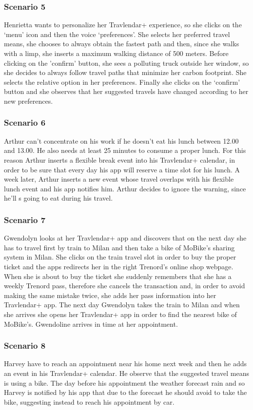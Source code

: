 	\subsubsection{Scenario 5}
		Henrietta wants to personalize her Travlendar+ experience, so she clicks on the ‘menu’ icon and then the voice ‘preferences’. She selects her preferred travel means, she chooses to always obtain the fastest path and then, since she walks with a limp, she inserts a maximum walking distance of 500 meters. Before clicking on the 'confirm' button, she sees a polluting truck outside her window, so she decides to always follow travel paths that minimize her carbon footprint. She selects the relative option in her preferences. Finally she clicks on the ‘confirm’ button and she observes that her suggested travels have changed according to her new preferences.
	\subsubsection{Scenario 6}
		Arthur can’t concentrate on his work if he doesn't eat his lunch between 12.00 and 13.00. He also needs at least 25 minutes to consume a proper lunch.
For this reason Arthur inserts a flexible break event into his Travlendar+ calendar, in order to be sure that every day his app will reserve a time slot for his lunch.
A week later, Arthur inserts a new event whose travel overlaps with his flexible lunch event and his app notifies him. Arthur decides to ignore the warning, since he'll s going to eat during his travel.
	\subsubsection{Scenario 7}
		Gwendolyn looks at her Travlendar+ app and discovers that on the next day she has to travel first by train to Milan and then take a bike of MoBike’s sharing system in Milan. She clicks on the train travel slot in order to buy the proper ticket and the apps redirects her in the right Trenord’s online shop webpage. When she is about to buy the ticket she suddenly remembers that she has a weekly Trenord pass, therefore she cancels the transaction and, in order to avoid making the same mistake twice, she adds her pass information into her Travlendar+ app. The next day Gwendolyn takes the train to Milan and when she arrives she opens her Travlendar+ app in order to find the nearest bike of MoBike’s. Gwendoline arrives in time at her appointment.
	\subsubsection{Scenario 8}
		Harvey have to reach an appointment near his home next week and then he adds an event in his Travlendar+ calendar. He observe that the suggested travel means is using a bike. The day before his appointment the weather forecast rain and so Harvey is notified by his app that due to the forecast he should avoid to take the bike, suggesting instead to reach his appointment by car.
